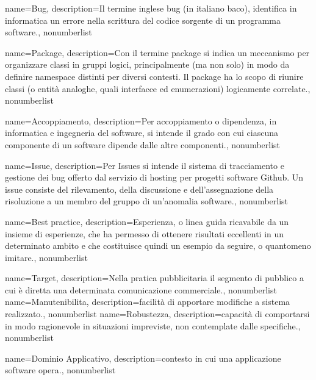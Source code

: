 {
	name={Bug},
	description={Il termine inglese bug (in italiano baco), identifica in informatica un errore nella scrittura del codice sorgente di un programma software.}, 
	nonumberlist 
}

{
	name={Package},
	description={Con il termine package si indica un meccanismo per organizzare classi in gruppi logici, principalmente (ma non solo) in modo da definire namespace distinti per diversi contesti. Il package ha lo scopo di riunire classi (o entità analoghe, quali interfacce ed enumerazioni) logicamente correlate.}, 
	nonumberlist 
}

{
	name={Accoppiamento},
	description={Per accoppiamento o dipendenza, in informatica e ingegneria del software, si intende il grado con cui ciascuna componente di un software dipende dalle altre componenti.}, 
	nonumberlist 
}

{
	name={Issue},
	description={Per Issues si intende il sistema di tracciamento e gestione dei bug offerto dal servizio di hosting per progetti software Github. Un issue consiste del rilevamento, della discussione e dell'assegnazione della risoluzione a un membro del gruppo di un'anomalia software.}, 
	nonumberlist 
}

{
	name={Best practice},
	description={Esperienza, o linea guida ricavabile da un insieme di esperienze, che ha permesso di ottenere risultati eccellenti in un determinato ambito e che costituisce quindi un esempio da seguire, o quantomeno imitare.}, 
	nonumberlist 
}

{
	name={Target},
	description={Nella pratica pubblicitaria il segmento di pubblico a cui è diretta una determinata comunicazione commerciale.}, 
	nonumberlist 
}
{
	name={Manutenibilita},
	description={facilità di apportare modifiche a sistema realizzato.}, 
	nonumberlist 
}
{
	name={Robustezza},
	description={capacità di comportarsi in modo ragionevole in situazioni impreviste, non contemplate dalle specifiche.}, 
	nonumberlist 
}


{
	name={Dominio Applicativo},
	description={contesto in cui una applicazione software opera.}, 
	nonumberlist 
}


